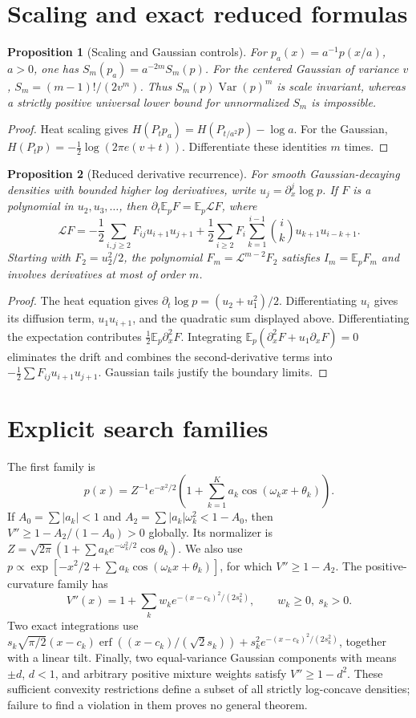\documentclass[11pt]{article}
\newtheorem{proposition}{Proposition}
\begin{document}
\section{Scaling and exact reduced formulas}
\begin{proposition}[Scaling and Gaussian controls]
For $p_a(x)=a^{-1}p(x/a)$, $a>0$, one has $S_m(p_a)=a^{-2m}S_m(p)$.
For the centered Gaussian of variance $v$, $S_m=(m-1)!/(2v^m)$.
Thus $S_m(p)\operatorname{Var}(p)^m$ is scale invariant, whereas a
strictly positive universal lower bound for unnormalized $S_m$ is impossible.
\end{proposition}
\begin{proof}
Heat scaling gives $H(P_tp_a)=H(P_{t/a^2}p)-\log a$.
For the Gaussian, $H(P_tp)=-\tfrac12\log(2\pi e(v+t))$.
Differentiate these identities $m$ times.
\end{proof}
\begin{proposition}[Reduced derivative recurrence]
For smooth Gaussian-decaying densities with bounded higher log derivatives,
write $u_j=\partial_x^j\log p$. If $F$ is a polynomial in $u_2,u_3,\ldots$,
then $\partial_t\mathbb E_p F=\mathbb E_p\mathcal LF$, where
\[
\mathcal LF=-\frac12\sum_{i,j\ge2}F_{ij}u_{i+1}u_{j+1}
+\frac12\sum_{i\ge2}F_i\sum_{k=1}^{i-1}\binom{i}{k}u_{k+1}u_{i-k+1}.
\]
Starting with $F_2=u_2^2/2$, the polynomial $F_m=\mathcal L^{m-2}F_2$
satisfies $I_m=\mathbb E_p F_m$ and involves derivatives at most of order $m$.
\end{proposition}
\begin{proof}
The heat equation gives $\partial_t\log p=(u_2+u_1^2)/2$.
Differentiating $u_i$ gives its diffusion term, $u_1u_{i+1}$, and the
quadratic sum displayed above. Differentiating the expectation contributes
$\tfrac12\mathbb E_p\partial_x^2F$.
Integrating $\mathbb E_p(\partial_x^2F+u_1\partial_xF)=0$
eliminates the drift and combines the second-derivative terms into
$-\tfrac12\sum F_{ij}u_{i+1}u_{j+1}$. Gaussian tails justify the boundary limits.
\end{proof}


\section{Explicit search families}
The first family is
\[
p(x)=Z^{-1}e^{-x^2/2}\left(1+\sum_{k=1}^K a_k\cos(\omega_kx+\theta_k)\right).
\]
If $A_0=\sum|a_k|<1$ and $A_2=\sum|a_k|\omega_k^2<1-A_0$,
then $V''\ge1-A_2/(1-A_0)>0$ globally. Its normalizer is
$Z=\sqrt{2\pi}(1+\sum a_ke^{-\omega_k^2/2}\cos\theta_k)$.
We also use $p\propto\exp[-x^2/2+\sum a_k\cos(\omega_kx+\theta_k)]$,
for which $V''\ge1-A_2$.
The positive-curvature family has
\[
 V''(x)=1+\sum_k w_k e^{-(x-c_k)^2/(2s_k^2)},\qquad w_k\ge0,\ s_k>0.
\]
Two exact integrations use
$s_k\sqrt{\pi/2}(x-c_k)\operatorname{erf}((x-c_k)/(\sqrt2s_k))
+s_k^2e^{-(x-c_k)^2/(2s_k^2)}$, together with a linear tilt.
Finally, two equal-variance Gaussian components with means $\pm d$, $d<1$,
and arbitrary positive mixture weights satisfy $V''\ge1-d^2$.
These sufficient convexity restrictions define a subset of all strictly
log-concave densities; failure to find a violation in them proves no general theorem.
\end{document}
